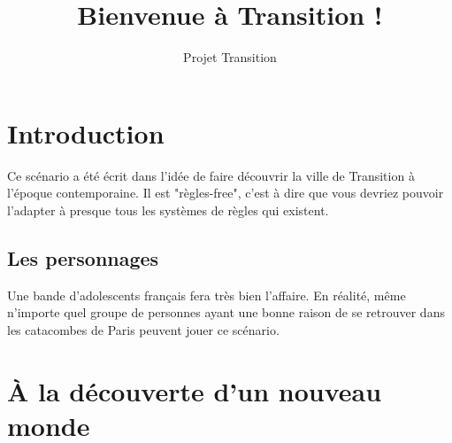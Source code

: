 \documentclass[10pt,a4paper,twocolumn]{article}
\author{Projet Transition}
\title{Bienvenue à Transition !}
\begin{document}
\maketitle
\section{Introduction}
Ce scénario a été écrit dans l'idée de faire découvrir la ville de Transition à l'époque contemporaine. Il est "règles-free", c'est à dire que vous devriez pouvoir l'adapter à presque tous les systèmes de règles qui existent.
\subsection{Les personnages}
Une bande d'adolescents français fera très bien l'affaire. En réalité, même n'importe quel groupe de personnes ayant une bonne raison de se retrouver dans les catacombes de Paris peuvent jouer ce scénario.

\section{À la découverte d'un nouveau monde}
\end{document}
